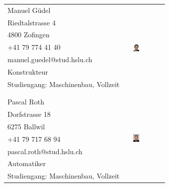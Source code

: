 \begin{tabular}{lp{3.3cm}l}
    Manuel Güdel                                & & 
	\multirow{8}{4cm}{\includegraphics[width=0.2\textwidth]{Sourcen/DasTeam/Bilder/ManuelGuedel.jpg}} \\
    Riedtalstrasse 4                            & &  \\
    4800 Zofingen                               & &  \\
    +41 79 774 41 40                            & &  \\
    manuel.guedel@stud.hslu.ch                  & &  \\
    Konstrukteur                                & &  \\
    Studiengang: Maschinenbau, Vollzeit         & &  \\
                                                & &  \\
    				                            & &  \\
    Pascal Roth 								& & \multirow{8}{4cm}{\includegraphics[width=0.2\textwidth]{Sourcen/DasTeam/Bilder/PascalRoth.jpg}} \\
    Dorfstrasse 18                              & &  \\
    6275 Ballwil                                & &  \\
    +41 79 717 68 94                            & &  \\
    pascal.roth@stud.hslu.ch                    & &  \\
    Automatiker                                 & &  \\
    Studiengang: Maschinenbau, Vollzeit         & &  \\
  \end{tabular}